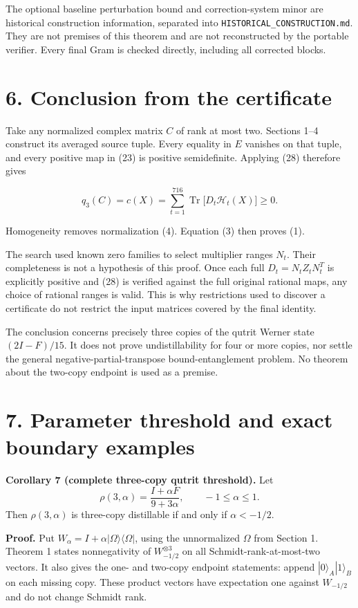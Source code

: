 \documentclass[
  11pt,
]{article}
\begin{document}
The optional baseline perturbation bound and correction-system minor are
historical construction information, separated into
\texttt{HISTORICAL\_CONSTRUCTION.md}. They are not premises of this
theorem and are not reconstructed by the portable verifier. Every final
Gram is checked directly, including all corrected blocks.

\section{6. Conclusion from the
certificate}\label{conclusion-from-the-certificate}

Take any normalized complex matrix \(C\) of rank at most two. Sections
1--4 construct its averaged source tuple. Every equality in \(E\)
vanishes on that tuple, and every positive map in (23) is positive
semidefinite. Applying (28) therefore gives

\[
q_3(C)=c(X)=\sum_{t=1}^{716}\operatorname{Tr}
\bigl[D_t\mathcal H_t(X)\bigr]\geq0.
\tag{29}
\]

Homogeneity removes normalization (4). Equation (3) then proves (1).

The search used known zero families to select multiplier ranges \(N_t\).
Their completeness is not a hypothesis of this proof. Once each full
\(D_t=N_tZ_tN_t^T\) is explicitly positive and (28) is verified against
the full original rational maps, any choice of rational ranges is valid.
This is why restrictions used to discover a certificate do not restrict
the input matrices covered by the final identity.

The conclusion concerns precisely three copies of the qutrit Werner
state \((2I-F)/15\). It does not prove undistillability for four or more
copies, nor settle the general negative-partial-transpose
bound-entanglement problem. No theorem about the two-copy endpoint is
used as a premise.

\section{7. Parameter threshold and exact boundary
examples}\label{parameter-threshold-and-exact-boundary-examples}

\textbf{Corollary 7 (complete three-copy qutrit threshold).} Let \[
\rho(3,\alpha)=\frac{I+\alpha F}{9+3\alpha},\qquad -1\leq\alpha\leq1.
\] Then \(\rho(3,\alpha)\) is three-copy distillable if and only if
\(\alpha<-1/2\).

\textbf{Proof.} Put \(W_\alpha=I+\alpha|\Omega\rangle\langle\Omega|\),
using the unnormalized \(\Omega\) from Section 1. Theorem 1 states
nonnegativity of \(W_{-1/2}^{\otimes3}\) on all Schmidt-rank-at-most-two
vectors. It also gives the one- and two-copy endpoint statements: append
\(|0\rangle_A|1\rangle_B\) on each missing copy. These product vectors
have expectation one against \(W_{-1/2}\) and do not change Schmidt
rank.
\end{document}
